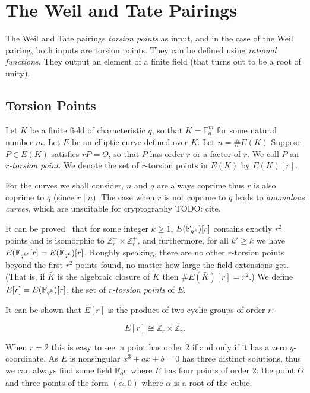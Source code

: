 \chapter {The Weil and Tate Pairings}

The Weil and Tate pairings \emph{torsion points}
as input, and in the case of the Weil pairing, both inputs are torsion points.
They can be defined using \emph{rational functions}.
They output an element of a finite field (that turns out to be a root of unity).

\section {Torsion Points}

Let $K$ be a finite field of characteristic $q$, so that
$K = \mathbb{F}_q^m$ for some natural number $m$.
Let $E$ be an elliptic curve defined
over $K$. Let $n=\#E(K)$
Suppose $P\in E(K)$ satisfies $r P = O$, so that $P$ has order $r$ or a
factor of $r$.
We call $P$ an \emph{$r$-torsion point}.
We denote the set of $r$-torsion points in $E(K)$ by
$E(K)[r]$.

For the curves we shall consider,
$n$ and $q$ are always coprime thus $r$ is also coprime to $q$
(since $r \mid n$).
The case when $r$ is not coprime
to $q$ leads to \emph{anomalous curves},
which are unsuitable for cryptography TODO: cite.

It can be proved~\cite{silverman} that for some integer $k \ge 1$,
$E(\mathbb{F}_{q^k})[r]$ contains exactly $r^2$ points and is isomorphic to
$\mathbb{Z}_r^+ \times \mathbb{Z}_r^+$,
and furthermore, for all $k' \ge k$ we have $E(\mathbb{F}_{q^{k'}} [r]
= E(\mathbb{F}_{q^k})[r]$.
Roughly speaking, there are no other $r$-torsion points beyond the
first $r^2$ points found, no matter how large the field extensions get.
(That is, if $\bar{K}$ is the algebraic closure of $K$ then $\#E(\bar{K})[r] = r^2$.)
We define $E[r] = E(\mathbb{F}_{q^k})[r]$, the set of
\emph{$r$-torsion points} of $E$.

It can be shown that $E[r]$ is the product of two cyclic groups of order $r$:

\[ E[r] \cong \mathbb{Z}_r \times \mathbb{Z}_r . \]

When $r=2$ this is easy to see: a point has order 2 if and only if it has
a zero $y$-coordinate. As $E$ is nonsingular
$x^3 + ax + b = 0$ has three distinct solutions, thus we can always find
some field $\mathbb{F}_{q^k}$ where $E$ has
four points of order 2: the point $O$ and three points of the form
$(\alpha, 0)$ where $\alpha$ is a root of the cubic.

